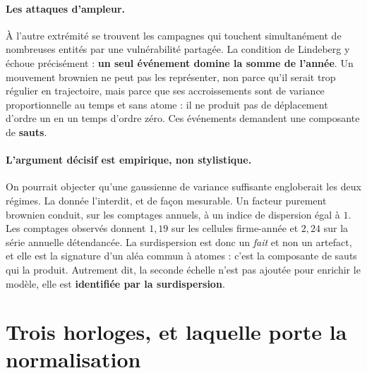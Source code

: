 \documentclass[11pt,a4paper]{article}
\begin{document}
\paragraph{Les attaques d'ampleur.} À l'autre extrémité se trouvent les campagnes qui
touchent simultanément de nombreuses entités par une vulnérabilité partagée. La condition
de Lindeberg y échoue précisément : \textbf{un seul événement domine la somme de l'année}.
Un mouvement brownien ne peut pas les représenter, non parce qu'il serait trop régulier en
trajectoire, mais parce que ses accroissements sont de variance proportionnelle au temps et
sans atome : il ne produit pas de déplacement d'ordre un en un temps d'ordre zéro. Ces
événements demandent une composante de \textbf{sauts}.

\paragraph{L'argument décisif est empirique, non stylistique.} On pourrait objecter qu'une
gaussienne de variance suffisante engloberait les deux régimes. La donnée l'interdit, et de
façon mesurable. Un facteur purement brownien conduit, sur les comptages annuels, à un
indice de dispersion égal à $1$. Les comptages observés donnent $1{,}19$ sur les cellules
firme-année et $2{,}24$ sur la série annuelle détendancée. La surdispersion est donc un
\emph{fait} et non un artefact, et elle est la signature d'un aléa commun à atomes : c'est
la composante de sauts qui la produit. Autrement dit, la seconde échelle n'est pas ajoutée
pour enrichir le modèle, elle est \textbf{identifiée par la surdispersion}.

\section{Trois horloges, et laquelle porte la normalisation}
\label{sec:horloges}

\end{document}
